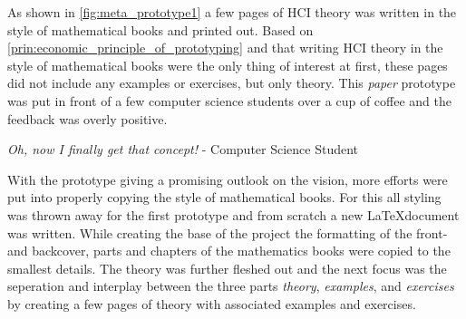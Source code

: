 

As shown in \ref{fig:meta_prototype1} a few pages of HCI theory was written in the style of mathematical books and printed out. Based on \ref{prin:economic_principle_of_prototyping} and that writing HCI theory in the style of mathematical books were the only thing of interest at first, these pages did not include any examples or exercises, but only theory. This \emph{paper} prototype was put in front of a few computer science students over a cup of coffee and the feedback was overly positive.

\begin{displayquote}
  \emph{Oh, now I finally get that concept!} - Computer Science Student
\end{displayquote}

With the prototype giving a promising outlook on the vision, more efforts were put into properly copying the style of mathematical books. For this all styling was thrown away for the first prototype and from scratch a new \LaTeX document was written. While creating the base of the project the formatting of the front- and backcover, parts and chapters of the mathematics books were copied to the smallest details. The theory was further fleshed out and the next focus was the seperation and interplay between the three parts \emph{theory}, \emph{examples}, and \emph{exercises} by creating a few pages of theory with associated examples and exercises.



\todo




